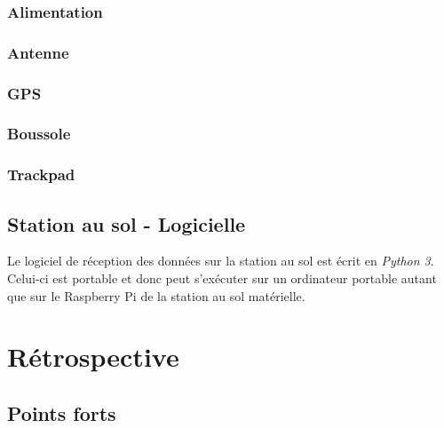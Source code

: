 \subsubsection{Alimentation}



\subsubsection{Antenne}



\subsubsection{GPS}



\subsubsection{Boussole}



\subsubsection{Trackpad}



\subsection{Station au sol - Logicielle}

Le logiciel de réception des données sur la station au sol est écrit en
\textit{Python 3}. Celui-ci est portable et donc peut s'exécuter sur un
ordinateur portable autant que sur le Raspberry Pi de la station au sol
matérielle.

\section{Rétrospective}

\subsection{Points forts}

